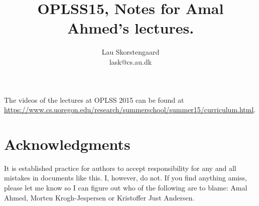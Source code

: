 \documentclass[a4paper,10pt,fleqn]{article}
\author{Lau Skorstengaard\\lask@cs.au.dk}
\title{OPLSS15, Notes for Amal Ahmed's lectures.}
\begin{document}
\maketitle The videos of the lectures at OPLSS 2015 can be found at \url{https://www.cs.uoregon.edu/research/summerschool/summer15/curriculum.html}.





\section*{Acknowledgments}
It is established practice for authors to accept responsibility for
any and all mistakes in documents like this. I, however, do not. If
you find anything amiss, please let me know so I can figure out who of
the following are to blame: Amal Ahmed, Morten Krogh-Jespersen or
Kristoffer Just Andersen.
\end{document}

